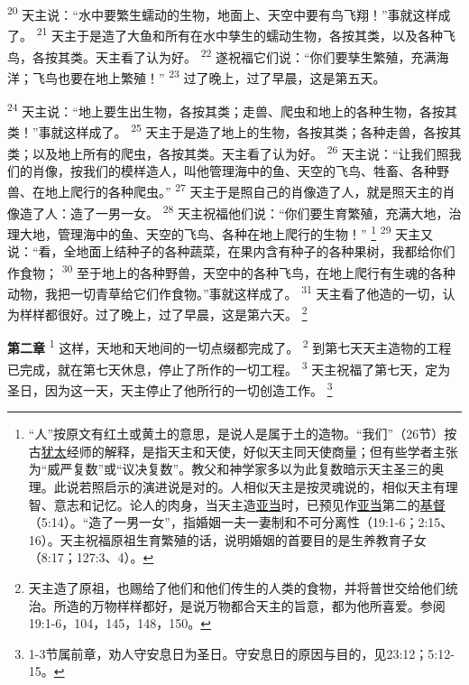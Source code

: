 \textsuperscript{20}
天主说：“水中要繁生蠕动的生物，地面上、天空中要有鸟飞翔！”事就这样成了。
\textsuperscript{21}
天主于是造了大鱼和所有在水中孳生的蠕动生物，各按其类，以及各种飞鸟，各按其类。天主看了认为好。
\textsuperscript{22}
遂祝福它们说：“你们要孳生繁殖，充满海洋；飞鸟也要在地上繁殖！”
\textsuperscript{23}
过了晚上，过了早晨，这是第五天。

\textsuperscript{24}
天主说：“地上要生出生物，各按其类；走兽、爬虫和地上的各种生物，各按其类！”事就这样成了。
\textsuperscript{25}
天主于是造了地上的生物，各按其类；各种走兽，各按其类；以及地上所有的爬虫，各按其类。天主看了认为好。
\textsuperscript{26}
天主说：“让我们照我们的肖像，按我们的模样造人，叫他管理海中的鱼、天空的飞鸟、牲畜、各种野兽、在地上爬行的各种爬虫。”
\textsuperscript{27}
天主于是照自己的肖像造了人，就是照天主的肖像造了人：造了一男一女。
\textsuperscript{28}
天主祝福他们说：“你们要生育繁殖，充满大地，治理大地，管理海中的鱼、天空的飞鸟、各种在地上爬行的生物！”
\footnote{“人”按原文有红土或黄土的意思，是说人是属于土的造物。“我们”（26节）按古\uline{犹太}经师的解释，是指天主和天使，好似天主同天使商量；但有些学者主张为“威严复数”或“议决复数”。教父和神学家多以为此复数暗示天主圣三的奥理。此说若照启示的演进说是对的。人相似天主是按灵魂说的，相似天主有理智、意志和记忆。论人的肉身，当天主造\uline{亚当}时，已预见作\uline{亚当}第二的\uline{基督}（5:14）。“造了一男一女”，指婚姻一夫一妻制和不可分离性（19:1-6；2:15、16）。天主祝福原祖生育繁殖的话，说明婚姻的首要目的是生养教育子女（8:17；127:3、4）。}
\textsuperscript{29}
天主又说：“看，全地面上结种子的各种蔬菜，在果内含有种子的各种果树，我都给你们作食物；
\textsuperscript{30}
至于地上的各种野兽，天空中的各种飞鸟，在地上爬行有生魂的各种动物，我把一切青草给它们作食物。”事就这样成了。
\textsuperscript{31}
天主看了他造的一切，认为样样都很好。过了晚上，过了早晨，这是第六天。
\footnote{天主造了原祖，也赐给了他们和他们传生的人类的食物，并将普世交给他们统治。所造的万物样样都好，是说万物都合天主的旨意，都为他所喜爱。参阅19:1-6，104，145，148，150。}

\textbf{第二章\quad}
\textsuperscript{1}
这样，天地和天地间的一切点缀都完成了。
\textsuperscript{2}
到第七天天主造物的工程已完成，就在第七天休息，停止了所作的一切工程。
\textsuperscript{3}
天主祝福了第七天，定为圣日，因为这一天，天主停止了他所行的一切创造工作。
\footnote{1-3节属前章，劝人守安息日为圣日。守安息日的原因与目的，见23:12；5:12-15。}

